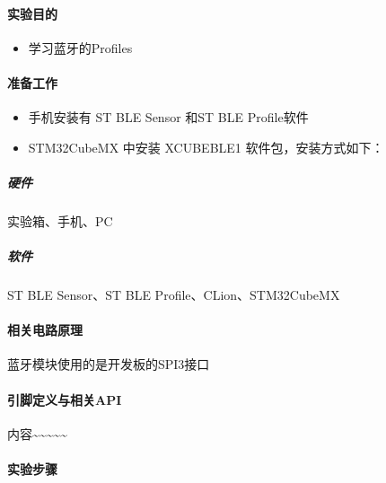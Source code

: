 \documentclass[a4paper,12pt,english]{sphinxmanual}
\begin{document}
\sphinxAtStartPar
{}


\paragraph{实验目的}
\label{\detokenize{exp-stm32/ble/Profiles:id1}}\begin{itemize}
\item {} 
\sphinxAtStartPar
学习蓝牙的Profiles

\end{itemize}


\paragraph{准备工作}
\label{\detokenize{exp-stm32/ble/Profiles:id2}}\begin{itemize}
\item {} 
\sphinxAtStartPar
手机安装有 ST BLE Sensor 和ST BLE Profile软件

\item {} 
\sphinxAtStartPar
STM32CubeMX 中安装 X\sphinxhyphen{}CUBE\sphinxhyphen{}BLE1 软件包，安装方式如下：

\end{itemize}






\subparagraph{硬件}
\label{\detokenize{exp-stm32/ble/Profiles:id3}}
\sphinxAtStartPar
实验箱、手机、PC


\subparagraph{软件}
\label{\detokenize{exp-stm32/ble/Profiles:id4}}
\sphinxAtStartPar
ST BLE Sensor、ST BLE Profile、CLion、STM32CubeMX


\paragraph{相关电路原理}
\label{\detokenize{exp-stm32/ble/Profiles:id5}}
\sphinxAtStartPar
蓝牙模块使用的是开发板的SPI3接口


\paragraph{引脚定义与相关API}
\label{\detokenize{exp-stm32/ble/Profiles:api}}
\sphinxAtStartPar
内容\textasciitilde{}\textasciitilde{}\textasciitilde{}\textasciitilde{}\textasciitilde{}


\paragraph{实验步骤}
\label{\detokenize{exp-stm32/ble/Profiles:id6}}
\end{document}
